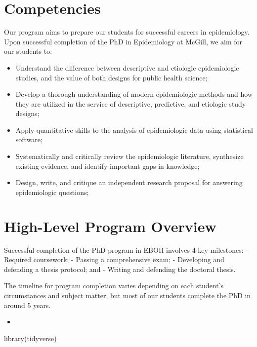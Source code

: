 \documentclass[
]{book}
\newenvironment{Shaded}{\begin{snugshade}}{\end{snugshade}}
\newcommand{\FunctionTok}[1]{\textcolor[rgb]{0.00,0.00,0.00}{#1}}
\newcommand{\NormalTok}[1]{#1}
\providecommand{\tightlist}{%
  \setlength{\itemsep}{0pt}\setlength{\parskip}{0pt}}
\begin{document}
\hypertarget{competencies}{%
\section{Competencies}\label{competencies}}

Our program aims to prepare our students for successful careers in epidemiology. Upon successful completion of the PhD in Epidemiology at McGill, we aim for our students to:

\begin{itemize}
\tightlist
\item
  Understand the difference between descriptive and etiologic epidemiologic studies, and the value of both designs for public health science;
\item
  Develop a thorough understanding of modern epidemiologic methods and how they are utilized in the service of descriptive, predictive, and etiologic study designs;
\item
  Apply quantitative skills to the analysis of epidemiologic data using statistical software;
\item
  Systematically and critically review the epidemiologic literature, synthesize existing evidence, and identify important gaps in knowledge;
\item
  Design, write, and critique an independent research proposal for answering epidemiologic questions;
\end{itemize}

\hypertarget{high-level-program-overview}{%
\section{High-Level Program Overview}\label{high-level-program-overview}}

Successful completion of the PhD program in EBOH involves 4 key milestones:
- Required coursework;
- Passing a comprehensive exam;
- Developing and defending a thesis protocol; and
- Writing and defending the doctoral thesis.

The timeline for program completion varies depending on each student's circumstances and subject matter, but most of our students complete the PhD in around 5 years.

\begin{itemize}
\tightlist
\item
\end{itemize}

\begin{Shaded}
\begin{Highlighting}[]
\FunctionTok{library}\NormalTok{(tidyverse)}
\end{Highlighting}
\end{Shaded}
\end{document}
